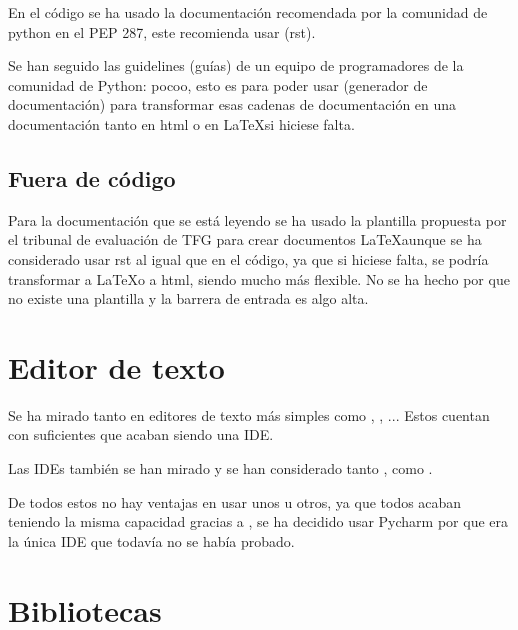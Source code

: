 En el código se ha usado la documentación recomendada por la comunidad de python en el PEP 287\cite{pep287}, este recomienda usar  (rst).

Se han seguido las guidelines (guías) de un equipo de programadores de la comunidad de Python: pocoo\cite{pocoo}, esto es para poder usar  (generador de documentación) para transformar esas cadenas de documentación en una documentación tanto en html o en \LaTeX  si hiciese falta.

\subsection{Fuera de código}

Para la documentación que se está leyendo se ha usado la plantilla propuesta por el tribunal de evaluación de TFG para crear documentos \LaTeX aunque se ha considerado usar rst al igual que en el código, ya que si hiciese falta, se podría transformar a \LaTeX o a html, siendo mucho más flexible. No se ha hecho por que no existe una plantilla y la barrera de entrada es algo alta.


\section{Editor de texto}

Se ha mirado tanto en editores de texto más simples como , , ... Estos cuentan con suficientes  que acaban siendo una IDE.

Las IDEs también se han mirado y se han considerado tanto ,  como .

De todos estos no hay ventajas en usar unos u otros, ya que todos acaban teniendo la misma capacidad gracias a , se ha decidido usar Pycharm por que era la única IDE que todavía no se había probado.


\section{Bibliotecas}

